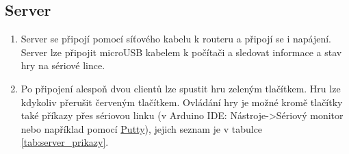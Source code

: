\documentclass[a4paper,12pt, twoside]{article} %
\begin{document}
\subsection{Server}
\begin{enumerate}
\item Server se připojí pomocí síťového kabelu k routeru a připojí se i napájení. Server lze připojit microUSB kabelem k počítači a sledovat informace a stav hry na sériové lince.

\item Po připojení alespoň dvou clientů lze spustit hru zeleným tlačítkem. Hru lze kdykoliv přerušit červeným tlačítkem. Ovládání hry je možné kromě tlačítky také příkazy přes sériovou linku (v Arduino IDE: Nástroje->Sériový monitor nebo například pomocí \href{https://www.putty.org/}{Putty}), jejich seznam je v tabulce \ref{tab:server_prikazy}.
\end{enumerate}

\end{document}
